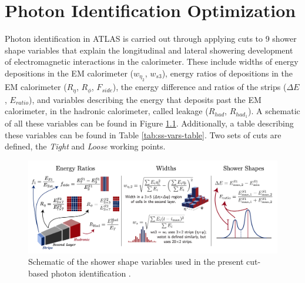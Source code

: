 \chapter{Photon Identification Optimization}

Photon identification in ATLAS is carried out through applying cuts to 9 shower shape variables that explain the longitudinal and lateral showering development of electromagnetic interactions in the calorimeter. These include widths of energy depositions in the \gls{EM} calorimeter ($w_{\eta_2}$, $w_{s3}$), energy ratios of depositions in the \gls{EM} calorimeter ($R_{\eta}$, $R_{\phi}$, $F_{side}$), the energy difference and ratios of the strips ($\Delta E$, $E_{ratio}$), and variables describing the energy that deposits past the \gls{EM} calorimeter, in the hadronic calorimeter, called leakage ($R_{had}$, $R_{had_1}$). A schematic of all these variables can be found in Figure \ref{fig:ss-vars-schematic}. Additionally, a table describing these variables can be found in Table \ref{tab:ss-vars-table}. Two sets of cuts are defined, the \textit{Tight} and \textit{Loose} working points. 

\begin{figure}
    \centering
    \includegraphics[width=.98\textwidth]{chapters/chapter4_photonID/images/ss-vars.png}
    \caption[Schematic of the shower shape variables used in the present cut-based photon identification.]
    {Schematic of the shower shape variables used in the present cut-based photon identification \cite{ss-var-schematic}.}
    \label{fig:ss-vars-schematic}
\end{figure}

